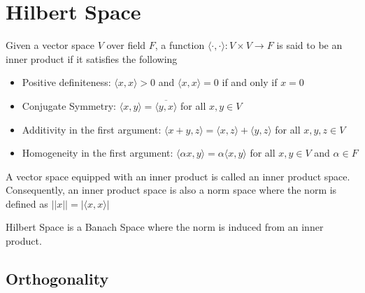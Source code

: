 \documentclass{report}
\begin{document}
\chapter{Hilbert Space}

\begin{definition}
    Given a vector space $V$ over field $F$, a function $\langle \cdot, \cdot \rangle: V \times V \to F$ is said to be an inner product if it satisfies the following
    \begin{itemize}
        \item Positive definiteness: $\langle x, x \rangle > 0$ and $\langle x, x \rangle = 0$ if and only if $x = 0$
        \item Conjugate Symmetry: $\langle x, y \rangle = \overline{\langle y, x \rangle}$ for all $x, y \in V$
        \item Additivity in the first argument: $\langle x + y, z \rangle = \langle x, z \rangle + \langle y, z \rangle$ for all $x, y, z \in V$
        \item Homogeneity in the first argument: $\langle \alpha x, y \rangle = \alpha \langle x, y \rangle$ for all $x, y \in V$ and $\alpha \in F$
    \end{itemize}
    A vector space equipped with an inner product is called an inner product space.
    Consequently, an inner product space is also a norm space where the norm is defined as $||x|| = |\langle x, x \rangle|$
\end{definition}

\begin{definition}
    Hilbert Space is a Banach Space where the norm is induced from an inner product.
\end{definition}

\section{Orthogonality}
\end{document}
